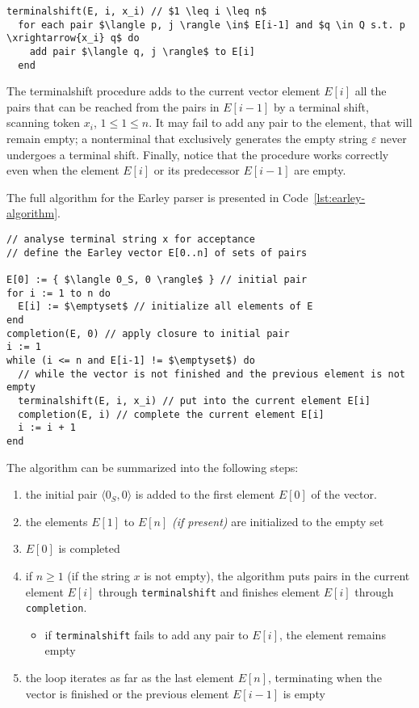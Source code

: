 \documentclass[english]{article}
\begin{document}
\begin{lstlisting}[caption={\texttt{terminalshift} procedure}, label={lst:earley-terminalshift}]
terminalshift(E, i, x_i) // $1 \leq i \leq n$
  for each pair $\langle p, j \rangle \in$ E[i-1] and $q \in Q s.t. p \xrightarrow{x_i} q$ do
    add pair $\langle q, j \rangle$ to E[i]
  end
\end{lstlisting}

The terminalshift procedure adds to the current vector element \(E[i]\) all the pairs that can be reached from the pairs in \(E[i-1]\) by a terminal shift, scanning token \(x_i\), \(1 \leq 1 \leq n\).
It may fail to add any pair to the element, that will remain empty;
a nonterminal that exclusively generates the empty string \(\varepsilon\) never undergoes a terminal shift.
Finally, notice that the procedure works correctly even when the element \(E[i]\) or its predecessor \(E[i-1]\) are empty.

The full algorithm for the Earley parser is presented in Code~\ref{lst:earley-algorithm}.

\begin{lstlisting}[caption={Earley's Algorithm}, label={lst:earley-algorithm}]
// analyse terminal string x for acceptance
// define the Earley vector E[0..n] of sets of pairs

E[0] := { $\langle 0_S, 0 \rangle$ } // initial pair
for i := 1 to n do
  E[i] := $\emptyset$ // initialize all elements of E
end
completion(E, 0) // apply closure to initial pair
i := 1
while (i <= n and E[i-1] != $\emptyset$) do
  // while the vector is not finished and the previous element is not empty
  terminalshift(E, i, x_i) // put into the current element E[i]
  completion(E, i) // complete the current element E[i]
  i := i + 1
end
\end{lstlisting}

\bigskip
The algorithm can be summarized into the following steps:
\begin{enumerate}
  \item the initial pair \(\langle 0_S, 0 \rangle\) is added to the first element \(E[0]\) of the vector.
  \item the elements \(E[1]\) to \(E[n]\) \textit{(if present)} are initialized to the empty set
  \item \(E[0]\) is completed
  \item if \(n \geq 1\) (if the string \(x\) is not empty), the algorithm puts pairs in the current element \(E[i]\) through \texttt{terminalshift} and finishes element \(E[i]\) through \texttt{completion}.
        \begin{itemize}[label=\(\rightarrow\)]
          \item if \texttt{terminalshift} fails to add any pair to \(E[i]\), the element remains empty
        \end{itemize}
  \item the loop iterates as far as the last element \(E[n]\), terminating when the vector is finished or the previous element \(E[i-1]\) is empty
\end{enumerate}
\end{document}
